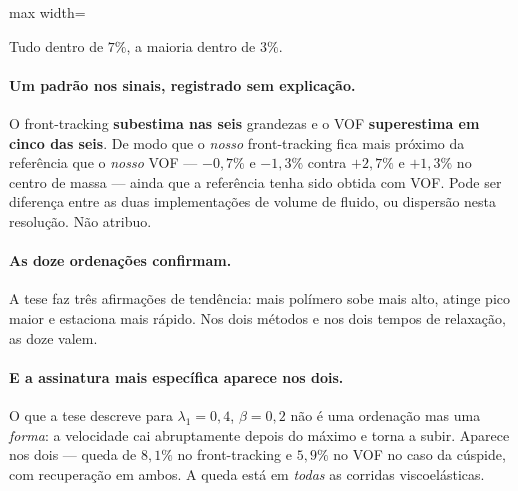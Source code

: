 \begin{adjustbox}{max width=\linewidth}
\end{adjustbox}

Tudo dentro de $7\%$, a maioria dentro de $3\%$.

\paragraph{Um padr\~ao nos sinais, registrado sem explica\c{c}\~ao.} O
front-tracking \textbf{subestima nas seis} grandezas e o VOF \textbf{superestima
em cinco das seis}. De modo que o \emph{nosso} front-tracking fica mais pr\'oximo
da refer\^encia que o \emph{nosso} VOF --- $-0{,}7\%$ e $-1{,}3\%$ contra
$+2{,}7\%$ e $+1{,}3\%$ no centro de massa --- ainda que a refer\^encia tenha
sido obtida com VOF. Pode ser diferen\c{c}a entre as duas implementa\c{c}\~oes de
volume de fluido, ou dispers\~ao nesta resolu\c{c}\~ao. N\~ao atribuo.

\paragraph{As doze ordena\c{c}\~oes confirmam.} A tese faz tr\^es
afirma\c{c}\~oes de tend\^encia: mais pol\'imero sobe mais alto, atinge pico
maior e estaciona mais r\'apido. Nos dois m\'etodos e nos dois tempos de
relaxa\c{c}\~ao, as doze valem.

\paragraph{E a assinatura mais espec\'ifica aparece nos dois.} O que a tese
descreve para $\lambda_1 = 0{,}4$, $\beta = 0{,}2$ n\~ao \'e uma ordena\c{c}\~ao
mas uma \emph{forma}: a velocidade cai abruptamente depois do m\'aximo e torna a
subir. Aparece nos dois --- queda de $8{,}1\%$ no front-tracking e $5{,}9\%$ no
VOF no caso da c\'uspide, com recupera\c{c}\~ao em ambos. A queda est\'a em
\emph{todas} as corridas viscoel\'asticas.

